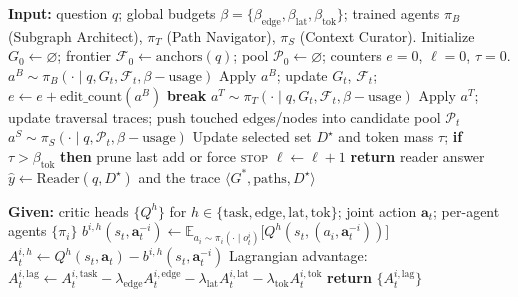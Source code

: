 \documentclass{article} %
\newcommand{\method}{\textsc{CLAUSE}\xspace}
\begin{document}
\begin{algorithm}[H]
\caption{Budgeted Inference (\method, decentralized execution)}
\label{alg:inference}
\begin{algorithmic}[1]
\State \textbf{Input:} question $q$; global budgets $\beta=\{\beta_{\text{edge}},\beta_{\text{lat}},\beta_{\text{tok}}\}$; trained agents $\pi_B$ (Subgraph Architect), $\pi_T$ (Path Navigator), $\pi_S$ (Context Curator).
\State Initialize $G_0\!\leftarrow\!\varnothing$; frontier $\mathcal{F}_0\!\leftarrow\!\text{anchors}(q)$; pool $\mathcal{P}_0\!\leftarrow\!\varnothing$; counters $e{=}0$, $\ell{=}0$, $\tau{=}0$.
  \State $a^B\!\sim\!\pi_B(\cdot\mid q,G_t,\mathcal{F}_t,\beta{-}\text{usage})$ 
  \State Apply $a^B$; update $G_t$, $\mathcal{F}_t$; $e\!\leftarrow\!e{+}\text{edit\_count}(a^B)$
   \textbf{break} \EndIf
  \State $a^T\!\sim\!\pi_T(\cdot\mid q,G_t,\mathcal{F}_t,\beta{-}\text{usage})$ 
  \State Apply $a^T$; update traversal traces; push touched edges/nodes into candidate pool $\mathcal{P}_t$
  \State $a^S\!\sim\!\pi_S(\cdot\mid q,\mathcal{P}_t,\beta{-}\text{usage})$ 
  \State Update selected set $D^\star$ and token mass $\tau$; \textbf{if} $\tau>\beta_{\text{tok}}$ \textbf{then} prune last add or force \textsc{stop}
  \State $\ell\!\leftarrow\!\ell{+}1$
\EndWhile
\State \textbf{return} reader answer $\hat y \leftarrow \mathrm{Reader}(q, D^\star)$ and the trace $\langle G^\ast,\text{paths},D^\star\rangle$
\end{algorithmic}
\end{algorithm}

\begin{algorithm}[H]
\caption{Counterfactual Advantage (per head) with Centralized Critic}
\label{alg:coma_head}
\begin{algorithmic}[1]
\State \textbf{Given:} critic heads $\{Q^{h}\}$ for $h\in\{\text{task},\text{edge},\text{lat},\text{tok}\}$; joint action $\mathbf a_t$; per-agent agents $\{\pi_i\}$
    \State $b^{i,h}(s_t,\mathbf a_t^{-i}) \leftarrow \mathbb E_{a_i\sim \pi_i(\cdot\mid o_t^i)}\!\big[Q^h(s_t,(a_i,\mathbf a_t^{-i}))\big]$
    \State $A^{i,h}_t \leftarrow Q^h(s_t,\mathbf a_t) - b^{i,h}(s_t,\mathbf a_t^{-i})$
  \EndFor
  \State Lagrangian advantage: $A^{i,\mathrm{lag}}_t \leftarrow A^{i,\mathrm{task}}_t - \lambda_{\text{edge}}A^{i,\text{edge}}_t - \lambda_{\text{lat}}A^{i,\text{lat}}_t - \lambda_{\text{tok}}A^{i,\text{tok}}_t$
\EndFor
\State \textbf{return} $\{A^{i,\mathrm{lag}}_t\}$
\end{algorithmic}
\end{algorithm}
\end{document}
